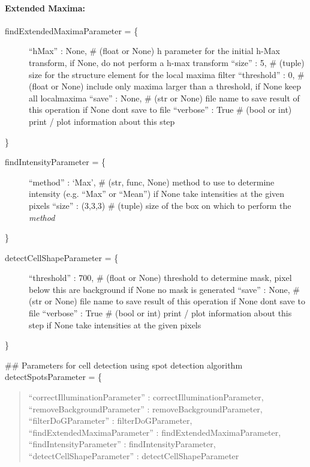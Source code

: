 \documentclass[letterpaper,10pt,english]{sphinxmanual}
\begin{document}
\paragraph{Extended Maxima:}
\label{tutorial:extended-maxima}\begin{description}
\item[{findExtendedMaximaParameter = \{}] \leavevmode
``hMax''      : None,            \# (float or None)     h parameter for the initial h-Max transform, if None, do not perform a h-max transform
``size''      : 5,             \# (tuple)             size for the structure element for the local maxima filter
``threshold'' : 0,        \# (float or None)     include only maxima larger than a threshold, if None keep all localmaxima
``save''      : None,         \# (str or None)       file name to save result of this operation if None dont save to file
``verbose''   : True       \# (bool or int)       print / plot information about this step

\end{description}

\}
\begin{description}
\item[{findIntensityParameter = \{}] \leavevmode
``method'' : `Max',       \# (str, func, None)   method to use to determine intensity (e.g. ``Max'' or ``Mean'') if None take intensities at the given pixels
``size''   : (3,3,3)       \# (tuple)             size of the box on which to perform the \emph{method}

\end{description}

\}
\begin{description}
\item[{detectCellShapeParameter = \{}] \leavevmode
``threshold'' : 700,     \# (float or None)      threshold to determine mask, pixel below this are background if None no mask is generated
``save''      : None,        \# (str or None)        file name to save result of this operation if None dont save to file
``verbose''   : True      \# (bool or int)        print / plot information about this step if None take intensities at the given pixels

\end{description}

\}

\#\# Parameters for cell detection using spot detection algorithm
detectSpotsParameter = \{
\begin{quote}

``correctIlluminationParameter'' : correctIlluminationParameter,
``removeBackgroundParameter''    : removeBackgroundParameter,
``filterDoGParameter''           : filterDoGParameter,
``findExtendedMaximaParameter''  : findExtendedMaximaParameter,
``findIntensityParameter''       : findIntensityParameter,
``detectCellShapeParameter''     : detectCellShapeParameter
\end{quote}
\end{document}
